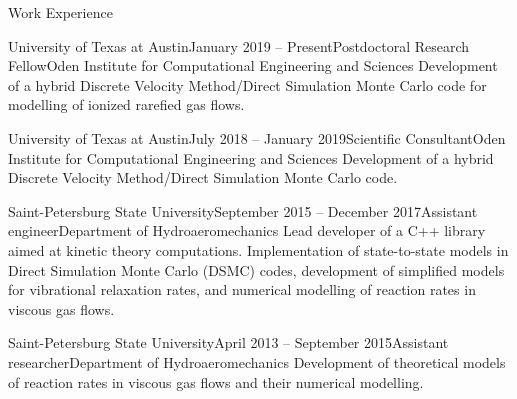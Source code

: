 \documentclass{resume} %
\begin{document}
\begin{rSection}{Work Experience}

\begin{rSubsection}{University of Texas at Austin}{January 2019 -- Present}{Postdoctoral Research Fellow}{Oden Institute for Computational Engineering and Sciences}
Development of a hybrid Discrete Velocity Method/Direct Simulation Monte Carlo code for modelling of ionized rarefied gas flows.
\end{rSubsection}


\begin{rSubsection}{University of Texas at Austin}{July 2018 -- January 2019}{Scientific Consultant}{Oden Institute for Computational Engineering and Sciences}
Development of a hybrid Discrete Velocity Method/Direct Simulation Monte Carlo code.
\end{rSubsection}

\begin{rSubsection}{Saint-Petersburg State University}{September 2015 -- December 2017}{Assistant engineer}{Department of Hydroaeromechanics}
Lead developer of a C++ library aimed at kinetic theory computations. Implementation of state-to-state models in Direct Simulation Monte Carlo (DSMC) codes, development of simplified models for vibrational relaxation rates, and numerical modelling of reaction rates in viscous gas flows.
\end{rSubsection}

\begin{rSubsection}{Saint-Petersburg State University}{April 2013 -- September 2015}{Assistant researcher}{Department of Hydroaeromechanics}
Development of theoretical models of reaction rates in viscous gas flows and their numerical modelling.
\end{rSubsection}




\end{rSection}
\end{document}
